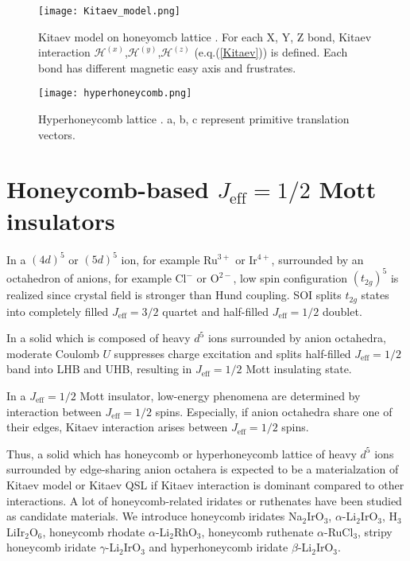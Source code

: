 \begin{figure}
  \centering
  \texttt{[image: Kitaev\_model.png]}
  \caption{Kitaev model on honeyomcb lattice \cite{kitaev2006anyons, kitagawa2018spin}.
  For each X, Y, Z bond, Kitaev interaction $\mathcal{H}^{(x)}$,$\mathcal{H}^{(y)}$,$\mathcal{H}^{(z)}$ (e.q.(\ref{Kitaev})) is defined.
  Each bond has different magnetic easy axis and frustrates.}
  \label{Kitaev_model}
\end{figure}

\begin{figure}
  \centering
  \texttt{[image: hyperhoneycomb.png]}
  \caption{Hyperhoneycomb lattice \cite{nasu2014vaporization}. a, b, c represent primitive translation vectors.}
  \label{hyperhoneycomb}
\end{figure}

\section{Honeycomb-based $J_{\mathrm{eff}} = 1/2$ Mott insulators}
\label{honeycomb_Jeff_Mott}
In a $(4d)^5$ or $(5d)^5$ ion, for example Ru$^{3+}$ or Ir$^{4+}$, surrounded by an octahedron of anions, for example Cl$^-$ or O$^{2-}$, low spin configuration $(t_{2g})^5$ is realized since crystal field is stronger than Hund coupling.
SOI splits $t_{2g}$ states into completely filled $J_{\mathrm{eff}} = 3/2$ quartet and half-filled $J_{\mathrm{eff}} = 1/2$ doublet.

In a solid which is composed of heavy $d^5$ ions surrounded by anion octahedra, moderate Coulomb $U$ suppresses charge excitation and splits half-filled $J_{\mathrm{eff}} = 1/2$ band into LHB and UHB, resulting in $J_{\mathrm{eff}} = 1/2$ Mott insulating state.

In a $J_{\mathrm{eff}} = 1/2$ Mott insulator, low-energy phenomena are determined by interaction between $J_{\mathrm{eff}} = 1/2$ spins.
Especially, if anion octahedra share one of their edges, Kitaev interaction arises between $J_{\mathrm{eff}} = 1/2$ spins.

Thus, a solid which has honeycomb or hyperhoneycomb lattice of heavy $d^5$ ions surrounded by edge-sharing anion octahera is expected to be a materialzation of Kitaev model or Kitaev QSL if Kitaev interaction is dominant compared to other interactions.
A lot of honeycomb-related iridates or ruthenates have been studied as candidate materials.
We introduce honeycomb iridates Na$_2$IrO$_3$, $\alpha$-Li$_2$IrO$_3$, H$_3$LiIr$_2$O$_6$, honeycomb rhodate $\alpha$-Li$_2$RhO$_3$, honeycomb ruthenate $\alpha$-RuCl$_3$, stripy honeycomb iridate $\gamma$-Li$_2$IrO$_3$ and hyperhoneycomb iridate $\beta$-Li$_2$IrO$_3$.

